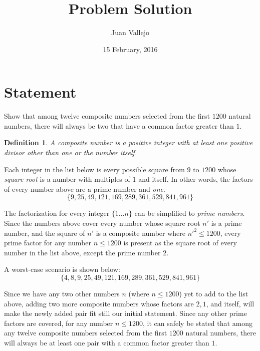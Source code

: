 \documentclass{amsart}
\title{Problem Solution}
\author{Juan Vallejo}
\date{15 February, 2016}
\begin{document}
\maketitle

\newtheorem{definition}{Definition}
\newtheorem{theorem}[definition]{Theorem}

\section*{Statement}

Show that among twelve composite numbers selected from the first $1200$ natural numbers, there will always be two that have a common factor greater than $1$.

\begin{definition} \label{def:1}
    \textit{A composite number is a positive integer with at least one positive divisor other than one or the number itself}.
\end{definition}

Each integer in the list below is every possible square from $9$ to $1200$ whose {\it square root} is a number with multiples of $1$ and itself. In other words, the factors of every number above are a prime number and {\it one}.
\begin{equation*}
  \lbrace 9,25,49,121,169,289,361,529,841,961 \rbrace
\end{equation*}

The factorization for every integer $\lbrace 1 \dots n \rbrace$ can be simplified to \textit{prime numbers}. Since the numbers above cover every number whose square root $n\prime$ is a prime number, and the square of $n\prime$ is a composite number where $n\prime^2 \leq 1200$, every prime factor for any number $n \leq 1200$ is present as the square root of every number in the list above, except the prime number $2$.

A worst-case scenario is shown below:
\begin{equation*}
  \lbrace 4,8,9,25,49,121,169,289,361,529,841,961 \rbrace
\end{equation*}

Since we have any two other numbers $n$ (where $n \leq 1200$) yet to add to the list above, adding two more composite numbers whose factors are $2, 1$, and itself, will make the newly added pair fit still our initial statement. Since any other prime factors are covered, for any number $n \leq 1200$, it can safely be stated that among any twelve composite numbers selected from the first $1200$ natural numbers, there will always be at least one pair with a common factor greater than $1$. 
\end{document}
